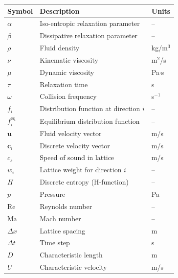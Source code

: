 \documentclass[12pt, a4paper, twoside, openright]{report}
\theoremstyle{definition}
\theoremstyle{remark}
\begin{document}
\begin{longtable}{lll}
\textbf{Symbol} & \textbf{Description} & \textbf{Units}\\
\hline
$\alpha$ & Iso-entropic relaxation parameter & --\\
$\beta$ & Dissipative relaxation parameter & --\\
$\rho$ & Fluid density & kg/m$^3$\\
$\nu$ & Kinematic viscosity & m$^2$/s\\
$\mu$ & Dynamic viscosity & Pa$\cdot$s\\
$\tau$ & Relaxation time & s\\
$\omega$ & Collision frequency & s$^{-1}$\\
$f_i$ & Distribution function at direction $i$ & --\\
$f_i^{\mathrm{eq}}$ & Equilibrium distribution function & --\\
$\mathbf{u}$ & Fluid velocity vector & m/s\\
$\mathbf{c}_i$ & Discrete velocity vector & m/s\\
$c_s$ & Speed of sound in lattice & m/s\\
$w_i$ & Lattice weight for direction $i$ & --\\
$H$ & Discrete entropy (H-function) & --\\
$p$ & Pressure & Pa\\
$\mathrm{Re}$ & Reynolds number & --\\
$\mathrm{Ma}$ & Mach number & --\\
$\Delta x$ & Lattice spacing & m\\
$\Delta t$ & Time step & s\\
$D$ & Characteristic length & m\\
$U$ & Characteristic velocity & m/s\\
\end{longtable}

\mainmatter
{}
\setcounter{page}{1}








\appendix




\backmatter


\end{document}
